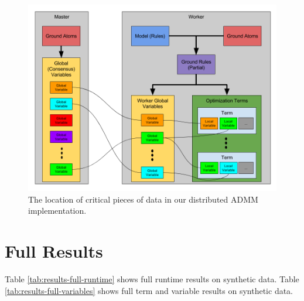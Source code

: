 \documentclass{article}
\begin{document}
    \begin{figure}[H]
        \centering
        \includegraphics[width=\textwidth]{images/ADMM_Distributed.png}
        \caption{The location of critical pieces of data in our distributed ADMM implementation.}
        \label{fig:distributed-admm-data}
    \end{figure}
    
\section{Full Results}
   \label{appendix:full-results}

    Table \ref{tab:results-full-runtime} shows full runtime results on synthetic data.
    Table \ref{tab:results-full-variables} shows full term and variable results on synthetic data.
\end{document}
